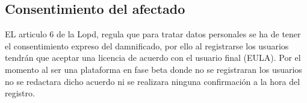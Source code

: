 \documentclass[12pt]{article} %
\begin{document}
\subsection{Consentimiento del afectado}
EL articulo 6 de la Lopd, regula que para tratar datos personales se ha de tener el consentimiento expreso del damnificado, por ello al registrarse los usuarios tendrán que aceptar una licencia de acuerdo con el usuario final (EULA). Por el momento al ser una plataforma en fase beta donde no se registraran los usuarios no se redactara dicho acuerdo ni se realizara ninguna confirmación a la hora del registro.
\newpage


\nocite{*}

\end{document}
